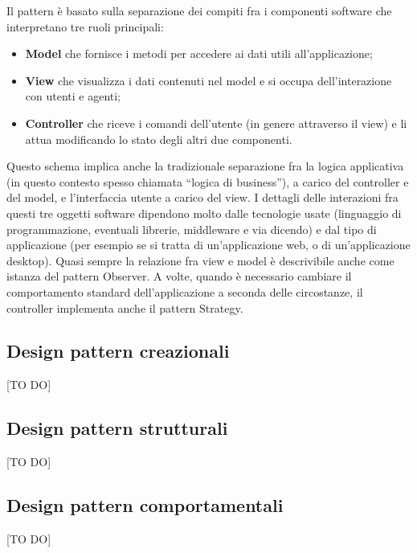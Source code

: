 		Il pattern è basato sulla separazione dei compiti fra i componenti software che interpretano tre ruoli principali:
		\begin{itemize}
			\item \textbf{Model} che fornisce i metodi per accedere ai dati utili all'applicazione;
			\item \textbf{View} che visualizza i dati contenuti nel model e si occupa dell'interazione con utenti e agenti;
			\item \textbf{Controller} che riceve i comandi dell'utente (in genere attraverso il view) e li attua modificando lo stato degli altri due componenti.
		\end{itemize}
		\noindent
		Questo schema implica anche la tradizionale separazione fra la logica applicativa (in questo contesto spesso chiamata ``logica di business''), a carico del controller e del model, e l'interfaccia utente a carico del view. I dettagli delle interazioni fra questi tre oggetti software dipendono molto dalle tecnologie usate (linguaggio di programmazione, eventuali librerie, middleware e via dicendo) e dal tipo di applicazione (per esempio se si tratta di un'applicazione web, o di un'applicazione desktop). Quasi sempre la relazione fra view e model è descrivibile anche come istanza del pattern Observer. A volte, quando è necessario cambiare il comportamento standard dell'applicazione a seconda delle circostanze, il controller implementa anche il pattern Strategy.




	\clearpage \newpage

	\subsection{Design pattern creazionali} %
	[TO DO]

	\clearpage \newpage

	\subsection{Design pattern strutturali} %
	[TO DO]

	\clearpage \newpage

	\subsection{Design pattern comportamentali} %
	[TO DO]


